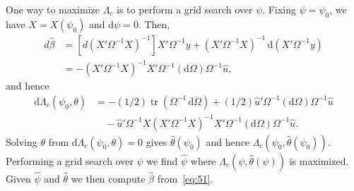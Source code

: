 \documentclass[12pt,a4paper]{article}
\theoremstyle{definition}
\DeclareMathOperator{\tr}{tr}
\newcommand{\dd}{\mathrm{d}}
\begin{document}
One way to maximize $\Lambda_c$ is to perform a grid search over $\psi$. Fixing $\psi = \psi_0$, we have $X = X(\psi_0)$ and $\dd\psi = 0$. Then,
\begin{align*}
d\hat{\beta} &= [d(X'\Omega^{-1}X)^{-1}]X'\Omega^{-1}y + (X'\Omega^{-1}X)^{-1}\, \dd(X'\Omega^{-1}y) \\
&= -(X'\Omega^{-1}X)^{-1}X'\Omega^{-1}(\dd\Omega)\Omega^{-1}\hat{u},
\end{align*}
and hence
\begin{align*}
\dd\Lambda_c(\psi_0, \theta) &= -(1/2)\tr(\Omega^{-1}\, \dd\Omega) + (1/2)\hat{u}'\Omega^{-1}(\dd\Omega)\Omega^{-1}\hat{u} \\
&\quad - \hat{u}'\Omega^{-1}X(X'\Omega^{-1}X)^{-1}X'\Omega^{-1}(\dd\Omega)\Omega^{-1}\hat{u}.
\end{align*}
Solving $\theta$ from $\dd\Lambda_c(\psi_0, \theta) = 0$ gives $\hat{\theta}(\psi_0)$ and hence $\Lambda_c(\psi_0, \hat{\theta}(\psi_0))$. Performing a grid search over $\psi$ we find $\hat{\psi}$ where $\Lambda_c(\psi, \hat{\theta}(\psi))$ is maximized. Given $\hat{\psi}$ and $\hat{\theta}$ we then compute $\hat{\beta}$ from~\eqref{eq:51}. %
\end{document}
